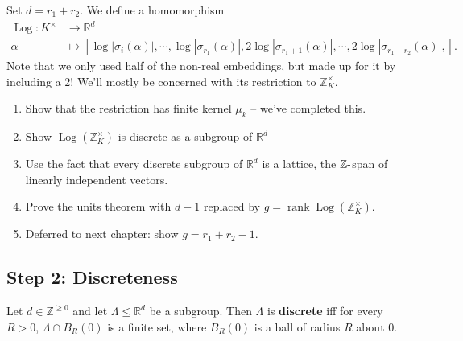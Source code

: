 \begin{remark}

Set \(d = r_1 + r_2\). We define a homomorphism
\begin{align*}
\operatorname{Log}: K^{\times}&\to {\mathbb{R}}^{d} \\
\alpha &\mapsto {\left[ { 
\log{\left\lvert {\sigma_i(\alpha)} \right\rvert}, 
\cdots,
\log{\left\lvert {\sigma_{r_1}(\alpha)} \right\rvert}, 
2 \log{\left\lvert {\sigma_{r_1+1}(\alpha)} \right\rvert}, 
\cdots,
2 \log{\left\lvert {\sigma_{r_1+r_2}(\alpha)} \right\rvert}, 
} \right]}
.\end{align*}
Note that we only used half of the non-real embeddings, but made up for
it by including a 2! We'll mostly be concerned with its restriction to
\({\mathbb{Z}}_K^{\times}\).

\begin{enumerate}
\def\labelenumi{\arabic{enumi}.}
\item
  Show that the restriction has finite kernel \(\mu_k\) -- we've
  completed this.
\item
  Show \(\operatorname{Log}({\mathbb{Z}}_K^{\times})\) is discrete as a
  subgroup of \({\mathbb{R}}^{d}\)
\item
  Use the fact that every discrete subgroup of \({\mathbb{R}}^d\) is a
  lattice, the \({\mathbb{Z}}{\hbox{-}}\)span of linearly independent
  vectors.
\item
  Prove the units theorem with \(d-1\) replaced by
  \(g = \operatorname{rank}\operatorname{Log}({\mathbb{Z}}_K^{\times})\).
\item
  Deferred to next chapter: show \(g = r_1 + r_2 - 1\).
\end{enumerate}

\end{remark}

\hypertarget{step-2-discreteness}{%
\subsection{Step 2: Discreteness}\label{step-2-discreteness}}

\begin{definition}

Let \(d\in {\mathbb{Z}}^{\geq 0}\) and let
\(\Lambda \leq {\mathbb{R}}^d\) be a subgroup. Then \(\Lambda\) is
\textbf{discrete} iff for every \(R>0\), \(\Lambda \cap B_R(0)\) is a
finite set, where \(B_R(0)\) is a ball of radius \(R\) about 0.

\end{definition}

